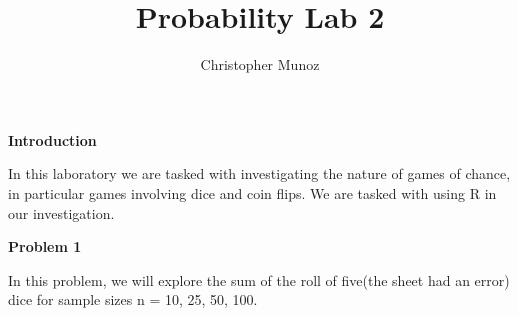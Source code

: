 \documentclass[12pt]{amsart}
\theoremstyle{remark}
\theoremstyle{mycomment}
\begin{document}
\title{\Large Probability Lab 2}
\author{Christopher Munoz}
\maketitle
\begin{center}
\textbf{Introduction}
\end{center}

\begin{center}
	In this laboratory we are tasked with investigating the nature of games of chance, in particular games involving dice and coin flips. We are tasked with using R in our investigation. 
\end{center}


\vspace{1cm}

\begin{center}
	\textbf{Problem 1}
\end{center}
In this problem, we will explore the sum of the roll of five(the sheet had an error) dice for sample sizes n = 10, 25, 50, 100.
\end{document}
